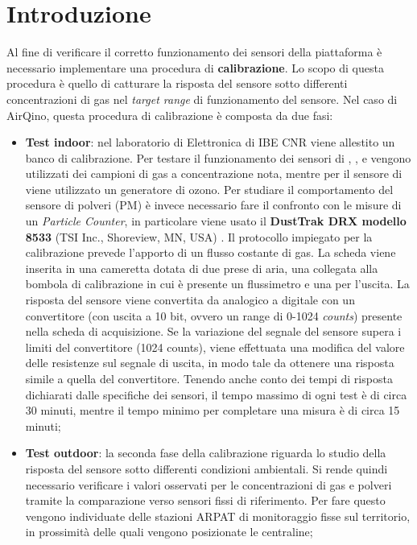 \section{Introduzione}\label{sec:calib-intro}
Al fine di verificare il corretto funzionamento dei sensori della piattaforma è necessario implementare una procedura di \textbf{calibrazione}. Lo scopo di questa procedura è quello di catturare la risposta del sensore sotto differenti concentrazioni di gas nel \textit{target range} di funzionamento del sensore. Nel caso di AirQino, questa procedura di calibrazione è composta da due fasi:
\begin{itemize}
  \item \textbf{Test indoor}: nel laboratorio di Elettronica di IBE CNR viene allestito un banco di calibrazione. Per testare il funzionamento dei sensori di , ,  e  vengono utilizzati dei campioni di gas a concentrazione nota, mentre per il sensore di  viene utilizzato un generatore di ozono. Per studiare il comportamento del sensore di polveri (PM) è invece necessario fare il confronto con le misure di un \textit{Particle Counter}, in particolare viene usato il \textbf{DustTrak DRX modello 8533} (TSI Inc., Shoreview, MN, USA) \cite{dust}. Il protocollo impiegato per la calibrazione prevede l’apporto di un flusso costante di gas. La scheda viene inserita in una cameretta dotata di due prese di aria, una collegata alla bombola di calibrazione in cui è presente un flussimetro e una per l’uscita. La risposta del sensore viene convertita da analogico a digitale con un convertitore (con uscita a 10 bit, ovvero un range di 0-1024 \textit{counts}) presente nella scheda di acquisizione. Se la variazione del segnale del sensore supera i limiti del convertitore (1024 counts), viene effettuata una modifica del valore delle resistenze sul segnale di uscita, in modo tale da ottenere una risposta simile a quella del convertitore. Tenendo anche conto dei tempi di risposta dichiarati dalle specifiche dei sensori, il tempo massimo di ogni test è di circa 30 minuti, mentre il tempo minimo per completare una misura è di circa 15 minuti; \cite{relazione_alice}
  \item \textbf{Test outdoor}: la seconda fase della calibrazione riguarda lo studio della risposta del sensore sotto differenti condizioni ambientali. Si rende quindi necessario verificare i valori osservati per le concentrazioni di gas e polveri tramite la comparazione verso sensori fissi di riferimento. Per fare questo vengono individuate delle stazioni ARPAT di monitoraggio fisse sul territorio, in prossimità delle quali vengono posizionate le centraline;\cite{relazione_alice}

\end{itemize}
